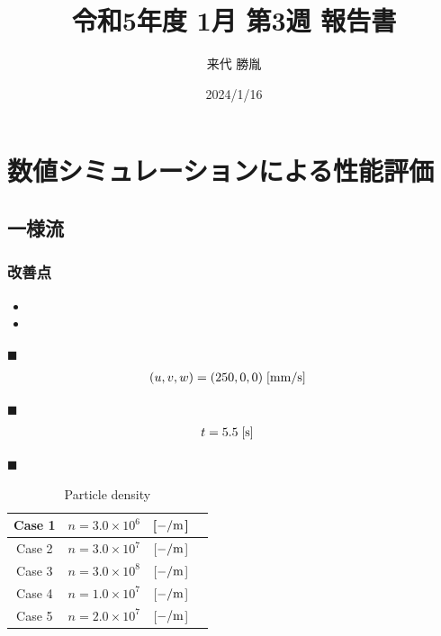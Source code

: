 \documentclass[twocolumn,a4j]{jsarticle}
\author{来代 勝胤}
\title{令和5年度 1月 第3週 報告書}
\date{2024/1/16}
\begin{document}
\columnseprule=0.1mm
\maketitle

\section{数値シミュレーションによる性能評価}
\subsection{一様流}

\subsubsection*{改善点}
\begin{itemize}
  \item {}
  \item {}
\end{itemize}

$\blacksquare$ 
\begin{align*}
  (u, v, w) & = (250, 0, 0) \;\rm{[mm/s]}
\end{align*}

$\blacksquare$ 
\begin{align*}
  t & = 5.5 \;\rm{[s]}
\end{align*}

$\blacksquare$ 
\begin{table}[hbtp]
  \centering
  \caption{Particle density}
  \begin{tabular}{c c c c}
    \hline
    Case 1 & $n = 3.0 \times 10^6$ & [$-/\rm{m}$] \\ \hline
    Case 2 & $n = 3.0 \times 10^7$ & [$-/\rm{m}$] \\ \hline
    Case 3 & $n = 3.0 \times 10^8$ & [$-/\rm{m}$] \\ \hline
    Case 4 & $n = 1.0 \times 10^7$ & [$-/\rm{m}$] \\ \hline
    Case 5 & $n = 2.0 \times 10^7$ & [$-/\rm{m}$] \\ \hline
  \end{tabular}\\
\end{table}
\end{document}
